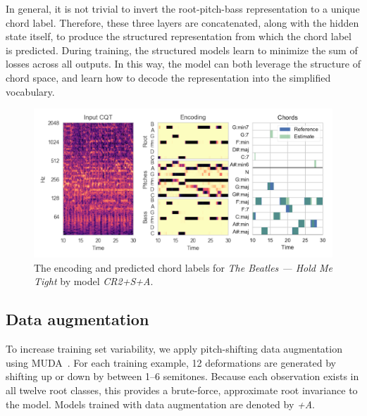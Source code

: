\documentclass{article}
\begin{document}
In general, it is not trivial to invert the root-pitch-bass representation to a unique chord label.
Therefore, these three layers are concatenated, along with the hidden state itself, to produce the structured representation from which the chord label is predicted.
During training, the structured models learn to minimize the sum of losses across all outputs.
In this way, the model can both leverage the structure of chord space, and learn how to decode the representation into the simplified vocabulary.
\begin{figure}[t]
    \centering
    \includegraphics[width=\columnwidth]{encviz}
    \caption{The encoding and predicted chord labels for \emph{The Beatles --- Hold Me Tight} by model \emph{CR2+S+A}.\label{fig:encviz}}
\end{figure}



\subsection{Data augmentation}
\label{sec:muda}
To increase training set variability, we apply pitch-shifting data augmentation using MUDA~\cite{mcfee2015software}.
For each training example, 12 deformations are generated by shifting up or down by between 1--6 semitones.
Because each observation exists in all twelve root classes, this provides a brute-force, approximate root invariance to the model.
Models trained with data augmentation are denoted by \emph{+A}.
\end{document}
